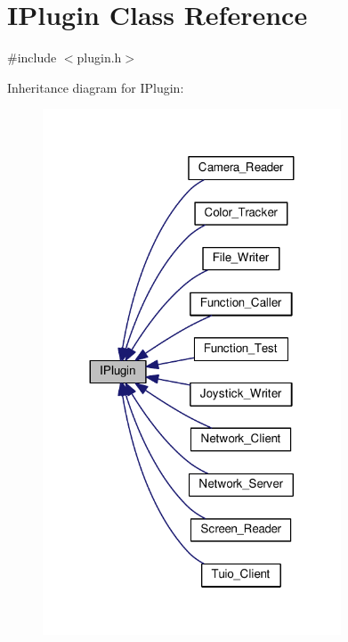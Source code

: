 \hypertarget{class_i_plugin}{}\section{I\+Plugin Class Reference}
\label{class_i_plugin}


{\ttfamily \#include $<$plugin.\+h$>$}



Inheritance diagram for I\+Plugin\+:\nopagebreak
\begin{figure}[H]
\begin{center}
\leavevmode
\includegraphics[width=251pt]{class_i_plugin__inherit__graph}
\end{center}
\end{figure}
